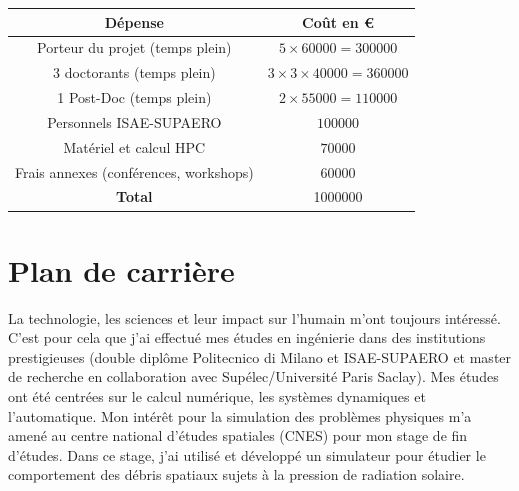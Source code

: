 \documentclass[12pt, french]{article}
\begin{document}
	\begin{center}
		\begin{tabular}{|c|c|}
			\hline
			D\'epense & Co\^{u}t en \euro \\
			\hline
			Porteur du projet (temps plein) & $5\times 60000=300000$ \\
			3 doctorants (temps plein) & $3\times 3\times 40000=360000$  \\
			1 Post-Doc (temps plein) & $2\times 55000=110000$ \\
			Personnels ISAE-SUPAERO & $100000$ \\
			Matériel  et calcul HPC & $70000$ \\
			Frais annexes (conférences, workshops) & $60000$ \\
			\hline
			\textbf{Total} & 1000000 \\
			\hline
		\end{tabular}
	\end{center}
	
	
	
	
	
	
	\section{Plan de carrière}
	
	La technologie, les sciences et leur impact sur l'humain m'ont toujours intéressé. C'est pour cela que j'ai effectué mes études en ingénierie dans des institutions prestigieuses (double diplôme Politecnico di Milano et ISAE-SUPAERO et master de recherche en collaboration avec Supélec/Université Paris Saclay). Mes études ont été centrées sur le calcul numérique, les systèmes dynamiques et l'automatique. Mon intérêt pour la simulation des problèmes physiques m'a amené au centre national d'études spatiales (CNES) pour mon stage de fin d'études. Dans ce stage, j'ai utilisé et développé un simulateur pour étudier le comportement des débris spatiaux sujets à la pression de radiation solaire. \\
	
\end{document}
